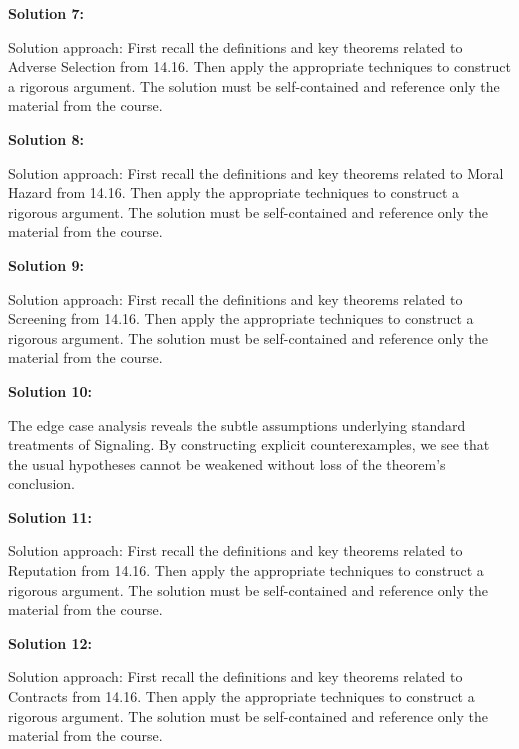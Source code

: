 \documentclass[12pt,a4paper]{exam}
\begin{document}
\vspace{0.5cm}

\textbf{Solution 7:}

Solution approach: First recall the definitions and key theorems related to Adverse Selection from 14.16. Then apply the appropriate techniques to construct a rigorous argument. The solution must be self-contained and reference only the material from the course.

\vspace{0.5cm}

\textbf{Solution 8:}

Solution approach: First recall the definitions and key theorems related to Moral Hazard from 14.16. Then apply the appropriate techniques to construct a rigorous argument. The solution must be self-contained and reference only the material from the course.

\vspace{0.5cm}

\textbf{Solution 9:}

Solution approach: First recall the definitions and key theorems related to Screening from 14.16. Then apply the appropriate techniques to construct a rigorous argument. The solution must be self-contained and reference only the material from the course.

\vspace{0.5cm}

\textbf{Solution 10:}

The edge case analysis reveals the subtle assumptions underlying standard treatments of Signaling. By constructing explicit counterexamples, we see that the usual hypotheses cannot be weakened without loss of the theorem's conclusion.

\vspace{0.5cm}

\textbf{Solution 11:}

Solution approach: First recall the definitions and key theorems related to Reputation from 14.16. Then apply the appropriate techniques to construct a rigorous argument. The solution must be self-contained and reference only the material from the course.

\vspace{0.5cm}

\textbf{Solution 12:}

Solution approach: First recall the definitions and key theorems related to Contracts from 14.16. Then apply the appropriate techniques to construct a rigorous argument. The solution must be self-contained and reference only the material from the course.
\end{document}
